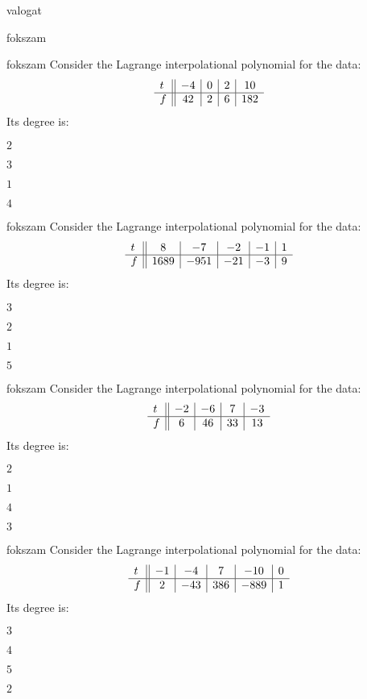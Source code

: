 \documentclass[12pt]{article}
\begin{document}
\begin{quiz}{valogat}
\begin{multi}{fokszam}
\end{multi}
\begin{multi}{fokszam}
Consider the Lagrange interpolational polynomial for the data:
$$\begin{array}{l ||c|c|c|c}t&-4&0&2&10\\ \hline f&42&2&6&182 \\ \end{array}$$
Its degree is:
\item* $ 2 $
\item  $ 3 $
\item  $ 1 $
\item  $ 4 $
\end{multi}
\begin{multi}{fokszam}
Consider the Lagrange interpolational polynomial for the data:
$$\begin{array}{l ||c|c|c|c|c}t&8&-7&-2&-1&1\\ \hline f&1689&-951&-21&-3&9 \\ \end{array}$$
Its degree is:
\item* $ 3 $
\item  $ 2 $
\item  $ 1 $
\item  $ 5 $
\end{multi}
\begin{multi}{fokszam}
Consider the Lagrange interpolational polynomial for the data:
$$\begin{array}{l ||c|c|c|c}t&-2&-6&7&-3\\ \hline f&6&46&33&13 \\ \end{array}$$
Its degree is:
\item* $ 2 $
\item  $ 1 $
\item  $ 4 $
\item  $ 3 $
\end{multi}
\begin{multi}{fokszam}
Consider the Lagrange interpolational polynomial for the data:
$$\begin{array}{l ||c|c|c|c|c}t&-1&-4&7&-10&0\\ \hline f&2&-43&386&-889&1 \\ \end{array}$$
Its degree is:
\item* $ 3 $
\item  $ 4 $
\item  $ 5 $
\item  $ 2 $

\end{multi}
\end{quiz}
\end{document}
